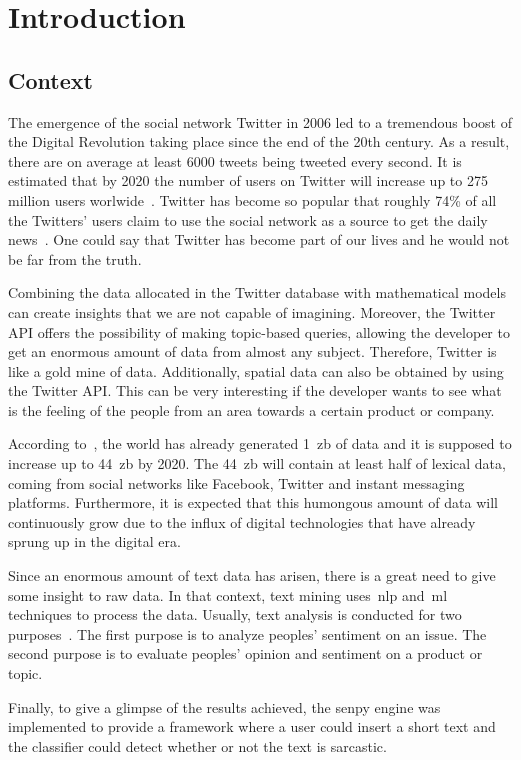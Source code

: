 \chapter{Introduction}



\section{Context}
The emergence of the social network Twitter in 2006 led to a tremendous boost of the Digital Revolution taking place since the end of the 20th century. As a result, there are on average at least 6000 tweets being tweeted every second. It is estimated that by 2020 the number of users on Twitter will increase up to 275 million users worlwide~\cite{twitter1}. Twitter has become so popular that roughly 74\% of all the Twitters' users claim to use the social network as a source to get the daily news~\cite{twitter2}. One could say that Twitter has become part of our lives and he would not be far from the truth.\par

 Combining the data allocated in the Twitter database with mathematical models can create insights that we are not capable of imagining. Moreover, the Twitter API offers the possibility of making topic-based queries, allowing the developer to get an enormous amount of data from almost any subject. Therefore, Twitter is like a gold mine of data. Additionally, spatial data can also be obtained by using the Twitter API. This can be very interesting if the developer wants to see what is the feeling of the people from an area towards a certain product or company. \par
According to~\cite{shayaa2018sentiment}, the world has already generated 1~\ac{zb} of data and it is supposed to increase up to 44~\ac{zb} by 2020. The 44~\ac{zb} will contain at least half of lexical data, coming from social networks like Facebook, Twitter and instant messaging platforms. Furthermore, it is expected that this humongous amount of data will continuously grow due to the influx of digital technologies that have already sprung up in the digital era.\par
Since an enormous amount of text data has arisen, there is a great need to give some insight to raw data. In that context, text mining uses~\ac{nlp} and~\ac{ml} techniques to process the data. Usually, text analysis is conducted for two purposes~\cite{shayaa2018sentiment}. The first purpose is to analyze peoples' sentiment on an issue. The second purpose is to evaluate peoples' opinion and sentiment on a product or topic.\par
Finally, to give a glimpse of the results achieved, the senpy engine was implemented to provide a framework where a user could insert a short text and the classifier could detect whether or not the text is sarcastic.
